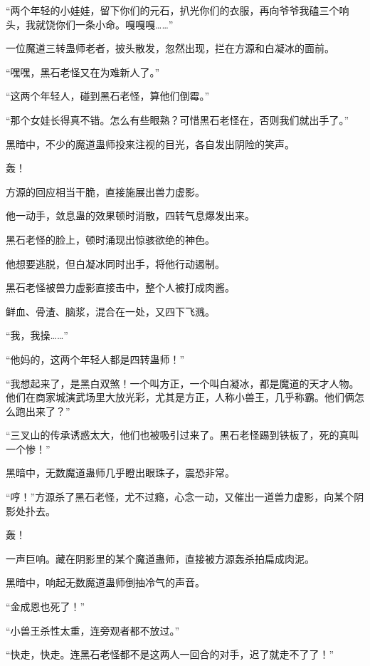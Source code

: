
\begin{this_body}

“两个年轻的小娃娃，留下你们的元石，扒光你们的衣服，再向爷爷我磕三个响头，我就饶你们一条小命。嘎嘎嘎……”

一位魔道三转蛊师老者，披头散发，忽然出现，拦在方源和白凝冰的面前。

“嘿嘿，黑石老怪又在为难新人了。”

“这两个年轻人，碰到黑石老怪，算他们倒霉。”

“那个女娃长得真不错。怎么有些眼熟？可惜黑石老怪在，否则我们就出手了。”

黑暗中，不少的魔道蛊师投来注视的目光，各自发出阴险的笑声。

轰！

方源的回应相当干脆，直接施展出兽力虚影。

他一动手，敛息蛊的效果顿时消散，四转气息爆发出来。

黑石老怪的脸上，顿时涌现出惊骇欲绝的神色。

他想要逃脱，但白凝冰同时出手，将他行动遏制。

黑石老怪被兽力虚影直接击中，整个人被打成肉酱。

鲜血、骨渣、脑浆，混合在一处，又四下飞溅。

“我，我操……”

“他妈的，这两个年轻人都是四转蛊师！”

“我想起来了，是黑白双煞！一个叫方正，一个叫白凝冰，都是魔道的天才人物。他们在商家城演武场里大放光彩，尤其是方正，人称小兽王，几乎称霸。他们俩怎么跑出来了？”

“三叉山的传承诱惑太大，他们也被吸引过来了。黑石老怪踢到铁板了，死的真叫一个惨！”

黑暗中，无数魔道蛊师几乎瞪出眼珠子，震恐非常。

“哼！”方源杀了黑石老怪，尤不过瘾，心念一动，又催出一道兽力虚影，向某个阴影处扑去。

轰！

一声巨响。藏在阴影里的某个魔道蛊师，直接被方源轰杀拍扁成肉泥。

黑暗中，响起无数魔道蛊师倒抽冷气的声音。

“金成恩也死了！”

“小兽王杀性太重，连旁观者都不放过。”

“快走，快走。连黑石老怪都不是这两人一回合的对手，迟了就走不了了！”


\end{this_body}
